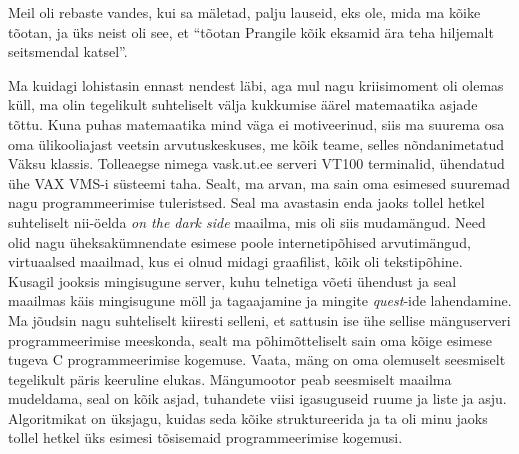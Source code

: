 Meil oli rebaste vandes, kui sa mäletad, palju lauseid, eks ole, mida ma kõike 
tõotan, ja üks neist oli see, et \enquote{tõotan Prangile kõik eksamid ära teha 
hiljemalt seitsmendal katsel}. 


Ma kuidagi lohistasin ennast nendest läbi, aga mul nagu kriisimoment oli olemas 
küll, ma olin tegelikult suhteliselt välja kukkumise äärel  matemaatika asjade 
tõttu. Kuna puhas matemaatika mind väga ei motiveerinud, siis ma suurema osa 
oma ülikooliajast veetsin 
arvutuskeskuses, me kõik teame, selles 
nõndanimetatud Väksu klassis\label{sisu:vase_klass}. Tolleaegse nimega 
vask.ut.ee serveri VT100 terminalid, ühendatud ühe 
VAX VMS-i  süsteemi taha. Sealt, ma arvan, ma sain oma esimesed suuremad  nagu 
programmeerimise tuleristsed.  Seal ma avastasin enda jaoks tollel hetkel 
suhteliselt nii-öelda \emph{on the dark side} maailma, mis oli siis 
 mudamängud. Need olid nagu üheksakümnendate 
esimese poole internetipõhised arvutimängud, virtuaalsed maailmad, kus ei olnud 
midagi graafilist, kõik oli tekstipõhine. Kusagil jooksis mingisugune server, 
kuhu telnetiga võeti ühendust ja seal maailmas käis mingisugune möll ja 
tagaajamine ja mingite \emph{quest}-ide lahendamine. Ma jõudsin nagu 
suhteliselt kiiresti selleni, et sattusin ise ühe sellise mänguserveri 
programmeerimise meeskonda, sealt ma põhimõtteliselt sain oma kõige esimese 
tugeva C programmeerimise kogemuse. Vaata, mäng on oma 
olemuselt seesmiselt tegelikult päris keeruline elukas. Mängumootor peab 
seesmiselt maailma mudeldama, seal on kõik asjad, tuhandete viisi igasuguseid 
ruume ja liste ja asju. Algoritmikat on üksjagu, kuidas seda kõike 
struktureerida ja ta oli minu jaoks tollel hetkel üks esimesi tõsisemaid  
programmeerimise kogemusi. 


